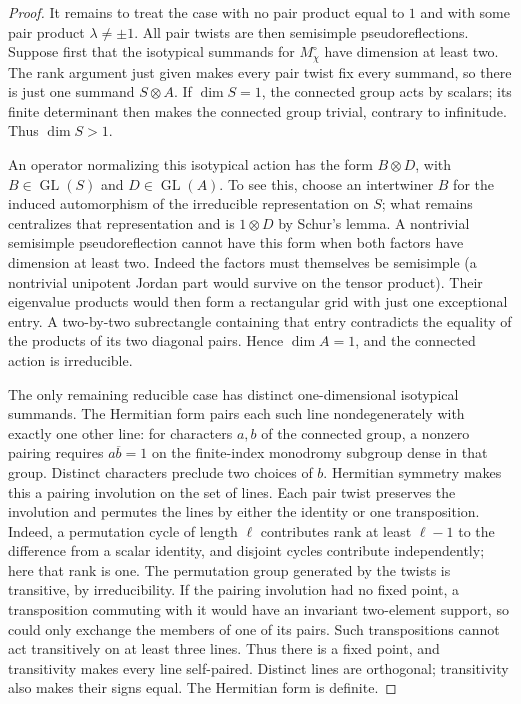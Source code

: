 \documentclass[11pt]{article}
\theoremstyle{plain}
\theoremstyle{definition}
\theoremstyle{remark}
\numberwithin{equation}{section}
\begin{document}
\begin{proof}
It remains to treat the case with no pair product equal to $1$
and with some pair product $\lambda\ne\pm1$.  All pair twists
are then semisimple pseudoreflections.  Suppose first that the
isotypical summands for $M_\chi^\circ$ have dimension at least
two.  The rank argument just given makes every pair twist fix
every summand, so there is just one summand $S\otimes A$.
If $\dim S=1$, the connected group acts by scalars; its finite
determinant then makes the connected group trivial, contrary to
infinitude.  Thus $\dim S>1$.

An operator normalizing this isotypical action has the form
$B\otimes D$, with $B\in\operatorname{GL}(S)$ and $D\in\operatorname{GL}(A)$.
To see this, choose an intertwiner $B$ for the induced automorphism
of the irreducible representation on $S$; what remains centralizes
that representation and is $1\otimes D$ by Schur's lemma.
A nontrivial semisimple pseudoreflection cannot have this form
when both factors have dimension at least two.  Indeed the factors
must themselves be semisimple (a nontrivial unipotent Jordan part
would survive on the tensor product).  Their eigenvalue products
would then form a rectangular grid with just one exceptional
entry.  A two-by-two subrectangle containing that entry contradicts
the equality of the products of its two diagonal pairs.  Hence
$\dim A=1$, and the connected action is irreducible.

The only remaining reducible case has distinct one-dimensional
isotypical summands.  The Hermitian form pairs each such line
nondegenerately with exactly one other line: for characters
$a,b$ of the connected group, a nonzero pairing requires
$a\overline b=1$ on the finite-index monodromy subgroup dense in
that group.  Distinct characters preclude two choices of $b$.
Hermitian symmetry makes this a pairing involution on the set of
lines.  Each pair twist preserves the involution and permutes the
lines by either the identity or one transposition.  Indeed, a
permutation cycle of length $\ell$ contributes rank at least $\ell-1$
to the difference from a scalar identity, and disjoint cycles
contribute independently; here that rank is one.  The permutation
group generated by the twists is transitive, by irreducibility.
If the pairing involution had no fixed point, a transposition
commuting with it would have an invariant two-element support, so
could only exchange the members of one of its pairs.  Such
transpositions cannot act transitively on at least
three lines.  Thus there is a fixed point, and transitivity makes
every line self-paired.  Distinct lines are orthogonal; transitivity
also makes their signs equal.  The Hermitian form is definite.


\end{proof}
\end{document}
